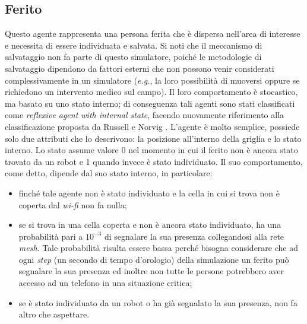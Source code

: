 
\subsection{Ferito}
Questo agente rappresenta una persona ferita che è dispersa nell'area di interesse e necessita di essere individuata e salvata. Si noti che il meccanismo di salvataggio non fa parte di questo simulatore, poiché le metodologie di salvataggio dipendono da fattori esterni che non possono venir considerati complessivamente in un simulatore (\textit{e.g.}, la loro possibilità di muoversi oppure se richiedono un intervento medico sul campo).
Il loro comportamento è stocastico, ma basato su uno stato interno; di conseguenza tali agenti sono stati classificati come \textit{reflexive agent with internal state}, facendo nuovamente riferimento alla classificazione proposta da Russell e Norvig \cite{russell2016}.
L'agente è molto semplice, possiede solo due attributi che lo descrivono: la posizione all'interno della griglia e lo stato interno. Lo stato assume valore 0 nel momento in cui il ferito non è ancora stato trovato da un robot e 1 quando invece è stato individuato.
Il suo comportamento, come detto, dipende dal suo stato interno, in particolare: 
\begin{itemize}
	\item finché tale agente non è stato individuato e la cella in cui si trova non è coperta dal \textit{wi-fi} non fa nulla;
	\item se si trova in una cella coperta e non è ancora stato individuato, ha una probabilità pari a $10^{-3}$ di segnalare la sua presenza collegandosi alla rete \textit{mesh}. Tale probabilità risulta essere bassa perché bisogna considerare che ad ogni \textit{step} (un secondo di tempo d'orologio) della simulazione un ferito può segnalare la sua presenza ed inoltre non tutte le persone potrebbero aver accesso ad un telefono in una situazione critica;
	\item se è stato individuato da un robot o ha già segnalato la sua presenza, non fa altro che aspettare.
\end{itemize}